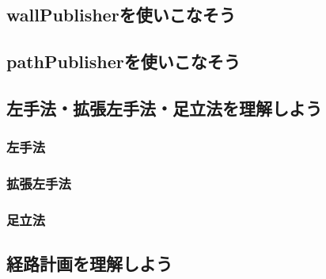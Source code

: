 \documentclass[11pt,a4paper]{jsarticle}
\begin{document}



\newpage



\newpage





\newpage
\subsection{wallPublisherを使いこなそう}




\newpage
\subsection{pathPublisherを使いこなそう}




\newpage
\subsection{左手法・拡張左手法・足立法を理解しよう}
\subsubsection{左手法}



\newpage
\subsubsection{拡張左手法}



\subsubsection{足立法}





\newpage
\subsection{経路計画を理解しよう}
\end{document}
